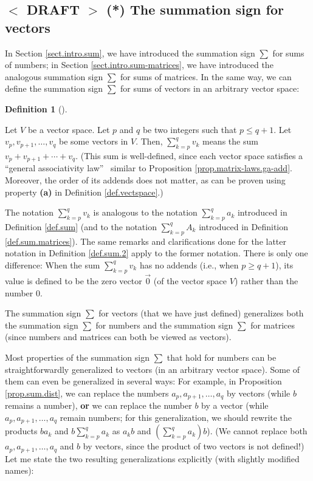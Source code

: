 \documentclass[numbers=enddot,12pt,final,onecolumn,notitlepage]{scrartcl}%
\theoremstyle{definition}
\newtheorem{defi}[theo]{Definition}
\newenvironment{definition}[1][]
{\begin{defi}[#1]\begin{leftbar}}
{\end{leftbar}\end{defi}}
\let\sumnonlimits\sum
\renewcommand{\sum}{\sumnonlimits\limits}
\begin{document}
\subsection{%
$<$%
DRAFT%
$>$
(*) The summation sign for vectors}

In Section \ref{sect.intro.sum}, we have introduced the summation sign $\sum$
for sums of numbers; in Section \ref{sect.intro.sum-matrices}, we have
introduced the analogous summation sign $\sum$ for sums of matrices. In the
same way, we can define the summation sign $\sum$ for sums of vectors in an
arbitrary vector space:

\begin{definition}
\label{def.sum.vectors}Let $V$ be a vector space. Let $p$ and $q$ be two
integers such that $p\leq q+1$. Let $v_{p},v_{p+1},\ldots,v_{q}$ be some
vectors in $V$. Then, $\sum_{k=p}^{q}v_{k}$ means the sum $v_{p}%
+v_{p+1}+\cdots+v_{q}$. (This sum is well-defined, since each vector space
satisfies a \textquotedblleft general associativity law\textquotedblright%
\ similar to Proposition \ref{prop.matrix-laws.ga-add}. Moreover, the order of
its addends does not matter, as can be proven using property \textbf{(a)} in
Definition \ref{def.vectspace}.)

The notation $\sum_{k=p}^{q}v_{k}$ is analogous to the notation $\sum
_{k=p}^{q}a_{k}$ introduced in Definition \ref{def.sum} (and to the notation
$\sum_{k=p}^{q}A_{k}$ introduced in Definition \ref{def.sum.matrices}). The
same remarks and clarifications done for the latter notation in Definition
\ref{def.sum.2} apply to the former notation. There is only one difference:
When the sum $\sum_{k=p}^{q}v_{k}$ has no addends (i.e., when $p\geq q+1$),
its value is defined to be the zero vector $\overrightarrow{0}$ (of the vector
space $V$) rather than the number $0$.
\end{definition}

The summation sign $\sum$ for vectors (that we have just defined) generalizes
both the summation sign $\sum$ for numbers and the summation sign $\sum$ for
matrices (since numbers and matrices can both be viewed as vectors).

Most properties of the summation sign $\sum$ that hold for numbers can be
straightforwardly generalized to vectors (in an arbitrary vector space). Some
of them can even be generalized in several ways: For example, in Proposition
\ref{prop.sum.dist}, we can replace the numbers $a_{p},a_{p+1},\ldots,a_{q}$
by vectors (while $b$ remains a number), \textbf{or} we can replace the number
$b$ by a vector (while $a_{p},a_{p+1},\ldots,a_{q}$ remain numbers; for this
generalization, we should rewrite the products $ba_{k}$ and $b\sum_{k=p}%
^{q}a_{k}$ as $a_{k}b$ and $\left(  \sum_{k=p}^{q}a_{k}\right)  b$). (We
cannot replace both $a_{p},a_{p+1},\ldots,a_{q}$ and $b$ by vectors, since the
product of two vectors is not defined!) Let me state the two resulting
generalizations explicitly (with slightly modified names):
\end{document}

